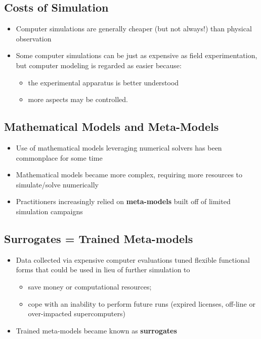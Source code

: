 \documentclass[
  letterpaper,
  DIV=11,
  numbers=noendperiod]{scrreprt}
\providecommand{\tightlist}{%
  \setlength{\itemsep}{0pt}\setlength{\parskip}{0pt}}\usepackage{longtable,booktabs,array}
\begin{document}
\subsection{Costs of Simulation}\label{costs-of-simulation}

\begin{itemize}
\tightlist
\item
  Computer simulations are generally cheaper (but not always!) than
  physical observation
\item
  Some computer simulations can be just as expensive as field
  experimentation, but computer modeling is regarded as easier because:

  \begin{itemize}
  \tightlist
  \item
    the experimental apparatus is better understood
  \item
    more aspects may be controlled.
  \end{itemize}
\end{itemize}

\subsection{Mathematical Models and
Meta-Models}\label{mathematical-models-and-meta-models}

\begin{itemize}
\tightlist
\item
  Use of mathematical models leveraging numerical solvers has been
  commonplace for some time
\item
  Mathematical models became more complex, requiring more resources to
  simulate/solve numerically
\item
  Practitioners increasingly relied on \textbf{meta-models} built off of
  limited simulation campaigns
\end{itemize}

\subsection{Surrogates = Trained
Meta-models}\label{surrogates-trained-meta-models}

\begin{itemize}
\tightlist
\item
  Data collected via expensive computer evaluations tuned flexible
  functional forms that could be used in lieu of further simulation to

  \begin{itemize}
  \tightlist
  \item
    save money or computational resources;
  \item
    cope with an inability to perform future runs (expired licenses,
    off-line or over-impacted supercomputers)
  \end{itemize}
\item
  Trained meta-models became known as \textbf{surrogates}
\end{itemize}
\end{document}
